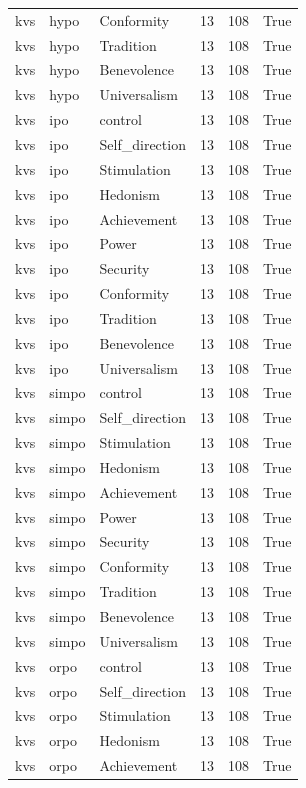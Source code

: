 \begin{tabular}{lllrrr}
kvs & hypo & Conformity & 13 & 108 & True \\
kvs & hypo & Tradition & 13 & 108 & True \\
kvs & hypo & Benevolence & 13 & 108 & True \\
kvs & hypo & Universalism & 13 & 108 & True \\
kvs & ipo & control & 13 & 108 & True \\
kvs & ipo & Self\_direction & 13 & 108 & True \\
kvs & ipo & Stimulation & 13 & 108 & True \\
kvs & ipo & Hedonism & 13 & 108 & True \\
kvs & ipo & Achievement & 13 & 108 & True \\
kvs & ipo & Power & 13 & 108 & True \\
kvs & ipo & Security & 13 & 108 & True \\
kvs & ipo & Conformity & 13 & 108 & True \\
kvs & ipo & Tradition & 13 & 108 & True \\
kvs & ipo & Benevolence & 13 & 108 & True \\
kvs & ipo & Universalism & 13 & 108 & True \\
kvs & simpo & control & 13 & 108 & True \\
kvs & simpo & Self\_direction & 13 & 108 & True \\
kvs & simpo & Stimulation & 13 & 108 & True \\
kvs & simpo & Hedonism & 13 & 108 & True \\
kvs & simpo & Achievement & 13 & 108 & True \\
kvs & simpo & Power & 13 & 108 & True \\
kvs & simpo & Security & 13 & 108 & True \\
kvs & simpo & Conformity & 13 & 108 & True \\
kvs & simpo & Tradition & 13 & 108 & True \\
kvs & simpo & Benevolence & 13 & 108 & True \\
kvs & simpo & Universalism & 13 & 108 & True \\
kvs & orpo & control & 13 & 108 & True \\
kvs & orpo & Self\_direction & 13 & 108 & True \\
kvs & orpo & Stimulation & 13 & 108 & True \\
kvs & orpo & Hedonism & 13 & 108 & True \\
kvs & orpo & Achievement & 13 & 108 & True \\

\end{tabular}
